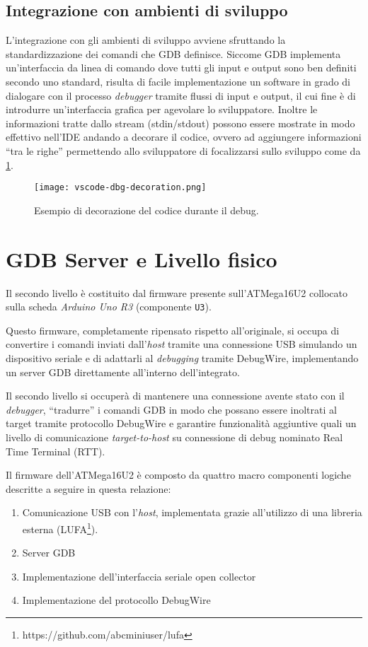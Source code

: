 \subsection{Integrazione con ambienti di sviluppo}\label{ss:code-decoration}

L'integrazione con gli ambienti di sviluppo avviene sfruttando la standardizzazione dei comandi che GDB definisce. Siccome GDB implementa un'interfaccia da linea di comando dove tutti gli input e output sono ben definiti secondo uno standard\cite{site:gdbproto}, risulta di facile implementazione un software in grado di dialogare con il processo \textit{debugger} tramite flussi di input e output, il cui fine è di introdurre un'interfaccia grafica per agevolare lo sviluppatore. Inoltre le informazioni tratte dallo stream (stdin/stdout) possono essere mostrate in modo effettivo nell'IDE andando a decorare il codice, ovvero ad aggiungere informazioni ``tra le righe'' permettendo allo sviluppatore di focalizzarsi sullo sviluppo come da \cref{fig:vscode-dbg-dec}.

\begin{figure}[t]
    \centering
    \texttt{[image: vscode-dbg-decoration.png]}
    \caption[]{Esempio di decorazione del codice durante il debug.}\label{fig:vscode-dbg-dec}
\end{figure}

\section{GDB Server e Livello fisico}

Il secondo livello è costituito dal firmware presente sull'ATMega16U2 collocato sulla scheda \textit{Arduino Uno R3} (componente \texttt{U3}).

Questo firmware, completamente ripensato rispetto all'originale, si occupa di convertire i comandi inviati dall'\textit{host} tramite una connessione USB simulando un dispositivo seriale e di adattarli al \textit{debugging} tramite DebugWire, implementando un server GDB direttamente all'interno dell'integrato.

Il secondo livello si occuperà di mantenere una connessione avente stato con il \textit{debugger}, ``tradurre'' i comandi GDB in modo che possano essere inoltrati al target tramite protocollo DebugWire e garantire funzionalità aggiuntive quali un livello di comunicazione \textit{target-to-host} su connessione di debug nominato Real Time Terminal (RTT).

Il firmware dell'ATMega16U2 è composto da quattro macro componenti logiche descritte a seguire in questa relazione:
\begin{enumerate}
    \item Comunicazione USB con l'\textit{host}, implementata grazie all'utilizzo di una libreria esterna (LUFA\footnote{https://github.com/abcminiuser/lufa}).
    \item Server GDB
    \item Implementazione dell'interfaccia seriale open collector
    \item Implementazione del protocollo DebugWire
\end{enumerate}

